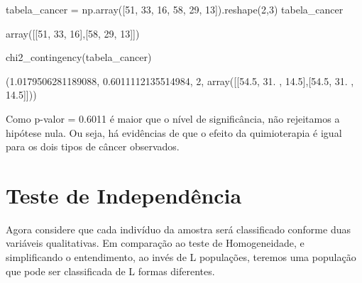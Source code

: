 \documentclass[
  letterpaper,
  DIV=11,
  numbers=noendperiod]{scrreprt}
\newenvironment{Shaded}{\begin{snugshade}}{\end{snugshade}}
\newcommand{\DecValTok}[1]{\textcolor[rgb]{0.68,0.00,0.00}{#1}}
\newcommand{\NormalTok}[1]{\textcolor[rgb]{0.00,0.23,0.31}{#1}}
\newcommand{\OperatorTok}[1]{\textcolor[rgb]{0.37,0.37,0.37}{#1}}
\begin{document}
\begin{Shaded}
\begin{Highlighting}[]
\NormalTok{tabela\_cancer }\OperatorTok{=}\NormalTok{ np.array([}\DecValTok{51}\NormalTok{, }\DecValTok{33}\NormalTok{, }\DecValTok{16}\NormalTok{, }\DecValTok{58}\NormalTok{, }\DecValTok{29}\NormalTok{, }\DecValTok{13}\NormalTok{]).reshape(}\DecValTok{2}\NormalTok{,}\DecValTok{3}\NormalTok{)}
\NormalTok{tabela\_cancer}
\end{Highlighting}
\end{Shaded}

\begin{tcolorbox}[enhanced jigsaw, breakable, leftrule=.75mm, left=2mm, opacityback=0, bottomrule=.15mm, toprule=.15mm, rightrule=.15mm, arc=.35mm, colback=white]

array({[}{[}51, 33, 16{]},{[}58, 29, 13{]}{]})

\end{tcolorbox}

\begin{Shaded}
\begin{Highlighting}[]
\NormalTok{chi2\_contingency(tabela\_cancer)}
\end{Highlighting}
\end{Shaded}

\begin{tcolorbox}[enhanced jigsaw, breakable, leftrule=.75mm, left=2mm, opacityback=0, bottomrule=.15mm, toprule=.15mm, rightrule=.15mm, arc=.35mm, colback=white]

(1.0179506281189088, 0.6011112135514984, 2, array({[}{[}54.5, 31. ,
14.5{]},{[}54.5, 31. , 14.5{]}{]}))

\end{tcolorbox}

Como p-valor = 0.6011 é maior que o nível de significância, não
rejeitamos a hipótese nula. Ou seja, há evidências de que o efeito da
quimioterapia é igual para os dois tipos de câncer observados.

\hypertarget{teste-de-independuxeancia}{%
\section{Teste de Independência}\label{teste-de-independuxeancia}}

Agora considere que cada indivíduo da amostra será classificado conforme
duas variáveis qualitativas. Em comparação ao teste de Homogeneidade, e
simplificando o entendimento, ao invés de L populações, teremos uma
população que pode ser classificada de L formas diferentes.
\end{document}
